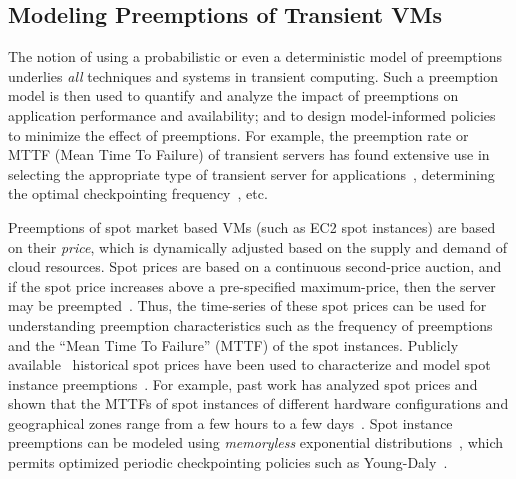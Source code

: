 \documentclass[compsoc]{IEEEtran}
\newcommand{\subsecspace}[0]{-0.20cm}
\begin{document}
\vspace*{\subsecspace}
\subsection{Modeling Preemptions of Transient VMs}


The notion of using a probabilistic or even a deterministic model of preemptions underlies \emph{all} techniques and systems in transient computing. 
Such a preemption model is then used to quantify and analyze the impact of preemptions on application performance and availability; and to design model-informed policies to minimize the effect of preemptions. 
For example, the preemption rate or MTTF (Mean Time To Failure) of transient servers has found extensive use in selecting the appropriate type of transient server for applications~\cite{exosphere, spoton}, determining the optimal checkpointing frequency~\cite{flint, marathe2014exploiting, proteus-eur17, ghit-spark-hpdc}, etc. 


Preemptions of spot market based VMs (such as EC2 spot instances) are based on their \emph{price}, which is dynamically adjusted based on the supply and demand of cloud resources. 
Spot prices are based on a continuous second-price auction, and if the spot price increases above a pre-specified maximum-price, then the server may be preempted~\cite{spot-pricing2}. 
Thus, the time-series of these spot prices can be used for understanding preemption characteristics such as the frequency of preemptions and the ``Mean Time To Failure'' (MTTF) of the spot instances. 
Publicly available~\cite{bidding4} historical spot prices have been used to characterize and model spot instance preemptions~\cite{spotcheck, bid-cloud, transient-guarantees, wolski2016providing, wolski2017probabilistic, bidding1, bidding7, guo_bidding_2015, irwin-icccn19}. 
For example, past work has analyzed spot prices and shown that the MTTFs of spot instances of different hardware configurations and geographical zones range from a few hours to a few days~\cite{wolski_probabilistic_2017, icdcs-spotlight, wolski2016providing, baughman2018predicting, wolski2017probabilistic}.
Spot instance preemptions can be modeled using \emph{memoryless}  exponential distributions~\cite{bid-cloud, hotcloud-not-bid, flint, ghit-spark-hpdc, chien-ic2e19}, which permits optimized periodic checkpointing policies such as Young-Daly~\cite{daly2006higher}. 
\end{document}
